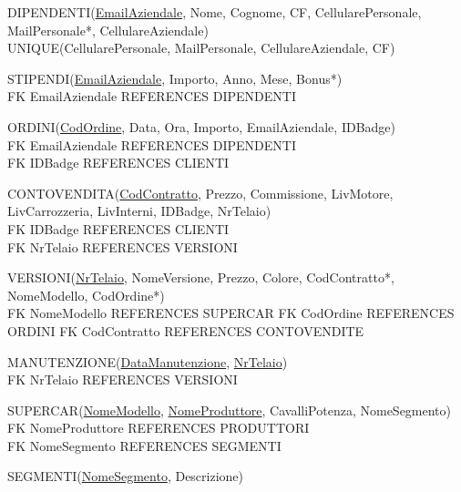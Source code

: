 \documentclass[11pt]{article}
\begin{document}
\begin{flushleft}
DIPENDENTI(\underline{EmailAziendale}, Nome, Cognome, CF, CellularePersonale,
MailPersonale*, CellulareAziendale)\\
UNIQUE(CellularePersonale, MailPersonale, CellulareAziendale, CF)
\end{flushleft}

\begin{flushleft}
STIPENDI(\underline{EmailAziendale}, Importo, Anno, Mese, Bonus*)\\
FK EmailAziendale REFERENCES DIPENDENTI
\end{flushleft}

\begin{flushleft}
ORDINI(\underline{CodOrdine}, Data, Ora, Importo, EmailAziendale, IDBadge)\\
FK EmailAziendale REFERENCES DIPENDENTI\\
FK IDBadge REFERENCES CLIENTI
\end{flushleft}

\begin{flushleft}
CONTOVENDITA(\underline{CodContratto}, Prezzo, Commissione, LivMotore,
LivCarrozzeria, LivInterni, IDBadge, NrTelaio)\\
FK IDBadge REFERENCES CLIENTI\\
FK NrTelaio REFERENCES VERSIONI
\end{flushleft}

\begin{flushleft}
VERSIONI(\underline{NrTelaio}, NomeVersione, Prezzo, Colore, CodContratto*, NomeModello, CodOrdine*)\\
FK NomeModello REFERENCES SUPERCAR
FK CodOrdine REFERENCES ORDINI
FK CodContratto REFERENCES CONTOVENDITE
\end{flushleft}

\begin{flushleft}
MANUTENZIONE(\underline{DataManutenzione}, \underline{NrTelaio})\\
FK NrTelaio REFERENCES VERSIONI
\end{flushleft}

\begin{flushleft}
SUPERCAR(\underline{NomeModello}, \underline{NomeProduttore}, CavalliPotenza, NomeSegmento)\\
FK NomeProduttore REFERENCES PRODUTTORI\\
FK NomeSegmento REFERENCES SEGMENTI
\end{flushleft}

\begin{flushleft}
SEGMENTI(\underline{NomeSegmento}, Descrizione)
\end{flushleft}
\end{document}
